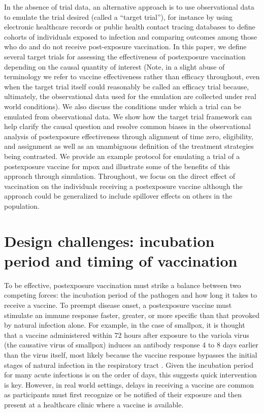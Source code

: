 \documentclass[11pt]{article}
\begin{document}
In the absence of trial data, an alternative approach is to use observational data to emulate the trial desired \cite{hernan_observational_2008,hernan_using_2016} (called a ``target trial''), for instance by using electronic healthcare records or public health contact tracing databases to define cohorts of individuals exposed to infection and comparing outcomes among those who do and do not receive post-exposure vaccination. In this paper, we define several target trials for assessing the effectiveness of postexposure vaccination depending on the causal quantity of interest (Note, in a slight abuse of terminology we refer to vaccine effectiveness rather than efficacy throughout, even when the target trial itself could reasonably be called an efficacy trial because, ultimately, the observational data used for the emulation are collected under real world conditions). We also discuss the conditions under which a trial can be emulated from observational data. We show how the target trial framework can help clarify the causal question and resolve common biases in the observational analysis of postexposure effectiveness through alignment of time zero, eligibility, and assignment as well as an unambiguous definition of the treatment strategies being contrasted. We provide an example protocol for emulating a trial of a postexposure vaccine for mpox and illustrate some of the benefits of this approach through simulation. Throughout, we focus on the direct effect of vaccination \cite{halloran_design_2010} on the individuals receiving a postexposure vaccine although the approach could be generalized to include spillover effects on others in the population.

\section{Design challenges: incubation period and timing of vaccination}
To be effective, postexposure vaccination must strike a balance between two competing forces: the incubation period of the pathogen and how long it takes to receive a vaccine. To preempt disease onset, a postexposure vaccine must stimulate an immune response faster, greater, or more specific than that provoked by natural infection alone. For example, in the case of smallpox, it is thought that a vaccine administered within 72 hours after exposure to the variola virus (the causative virus of smallpox) induces an antibody response 4 to 8 days earlier than the virus itself, most likely because the vaccine response bypasses the initial stages of natural infection in the respiratory tract \cite{massoudi_effectiveness_2003,keckler_effects_2013}. Given the incubation period for many acute infections is on the order of days, this suggests quick intervention is key. However, in real world settings, delays in receiving a vaccine are common as participants must first recognize or be notified of their exposure and then present at a healthcare clinic where a vaccine is available. 
\end{document}

